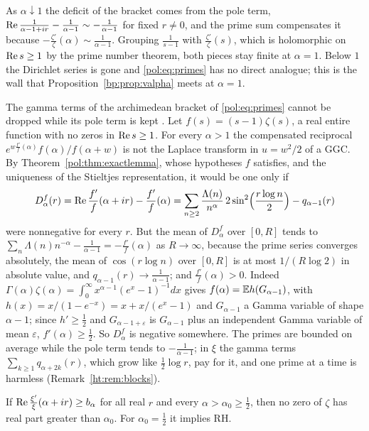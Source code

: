 As $\alpha\downarrow1$ the deficit of the bracket comes from the pole term, $\operatorname{Re}\frac{1}{\alpha-1+ir}-\frac{1}{\alpha-1}\sim-\frac1{\alpha-1}$ for fixed $r\ne0$, and the prime sum compensates it because $-\frac{\zeta'}{\zeta}(\alpha)\sim\frac1{\alpha-1}$. Grouping $\frac1{s-1}$ with $\frac{\zeta'}{\zeta}(s)$, which is holomorphic on $\operatorname{Re} s\ge1$ by the prime number theorem, both pieces stay finite at $\alpha=1$. Below $1$ the Dirichlet series is gone and \eqref{pol:eq:primes} has no direct analogue; this is the wall that Proposition~\ref{bp:prop:valpha} meets at $\alpha=1$.

\begin{remark}\label{pol:rem:pole}
The gamma terms of the archimedean bracket of \eqref{pol:eq:primes} cannot be dropped while its pole term is kept \cite{PolsonRXi26}. Let $f(s)=(s-1)\zeta(s)$, a real entire function with no zeros in $\operatorname{Re} s\ge1$. For every $\alpha>1$ the compensated reciprocal $e^{w\frac{f'}f(\alpha)}f(\alpha)/f(\alpha+w)$ is not the Laplace transform in $u=w^2/2$ of a GGC. By Theorem~\ref{pol:thm:exactlemma}, whose hypotheses $f$ satisfies, and the uniqueness of the Stieltjes representation, it would be one only if
\[
D^f_\alpha(r)=\operatorname{Re}\frac{f'}f(\alpha+ir)-\frac{f'}f(\alpha)=\sum_{n\ge2}\frac{\Lambda(n)}{n^\alpha}\,2\sin^2\Bigl(\frac{r\log n}2\Bigr)-q_{\alpha-1}(r)
\]
were nonnegative for every $r$. But the mean of $D^f_\alpha$ over $[0,R]$ tends to $\sum_n\Lambda(n)n^{-\alpha}-\frac1{\alpha-1}=-\frac{f'}f(\alpha)$ as $R\to\infty$, because the prime series converges absolutely, the mean of $\cos(r\log n)$ over $[0,R]$ is at most $1/(R\log2)$ in absolute value, and $q_{\alpha-1}(r)\to\frac1{\alpha-1}$; and $\frac{f'}f(\alpha)>0$. Indeed $\Gamma(\alpha)\zeta(\alpha)=\int_0^\infty x^{\alpha-1}(e^x-1)^{-1}dx$ gives $f(\alpha)=\mathbb{E} h(G_{\alpha-1})$, with $h(x)=x/(1-e^{-x})=x+x/(e^x-1)$ and $G_{\alpha-1}$ a Gamma variable of shape $\alpha-1$; since $h'\ge\frac12$ and $G_{\alpha-1+\varepsilon}$ is $G_{\alpha-1}$ plus an independent Gamma variable of mean $\varepsilon$, $f'(\alpha)\ge\frac12$. So $D^f_\alpha$ is negative somewhere. The primes are bounded on average while the pole term tends to $-\frac1{\alpha-1}$; in $\xi$ the gamma terms $\sum_{k\ge1}q_{\alpha+2k}(r)$, which grow like $\frac12\log r$, pay for it, and one prime at a time is harmless (Remark~\ref{ht:rem:blocks}).
\end{remark}

\begin{proposition}\label{pol:prop:comp}
If $\operatorname{Re}\frac{\xi'}{\xi}(\alpha+ir)\ge b_\alpha$ for all real $r$ and every $\alpha>\alpha_0\ge\frac12$, then no zero of $\zeta$ has real part greater than $\alpha_0$. For $\alpha_0=\frac12$ it implies RH.
\end{proposition}

